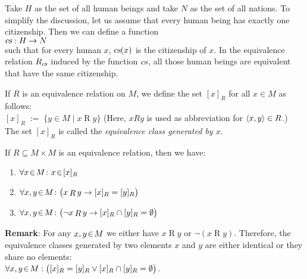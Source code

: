 \example
Take  $H$ as the set of all human beings and take $N$ as the set of all nations.
To simplify the discussion, let us assume that every human being has exactly one citizenship.
Then we can define a function
\\[0.2cm]
\hspace*{1.3cm}
$\textsl{cs}: H \rightarrow N$
\\[0.2cm]
such that for every human $x$,  $\textsl{cs}(x)$ is the citizenship of $x$.  
In the equivalence relation $R_{\textsl{cs}}$ induced by the function $\textsl{cs}$, all those human
beings are equivalent that have the same citizenship.


\begin{Definition}
If $R$ is an  equivalence relation on  $M$, we define 
the set $[x]_R$ for all  $x \in M$ as follows: 
\\[0.2cm]
\hspace*{1.3cm}
$[x]_R \;:=\; \bigl\{ y \in M \mid x \mathop{R} y \bigr\}$ \qquad
(Here,  $x R y$ is used as abbreviation for $\pair(x, y) \in R$.) 
\\[0.2cm]
The set  $[x]_R$ is called the \emph{equivalence class generated by $x$}.
\end{Definition}

\begin{Proposition} \label{prop:14}
If $R \subseteq M \times M$ is an equivalence relation, then we have: 
\begin{enumerate}
\item $\forall x \!\in\! M \colon x \!\in\! [x]_R$
\item $\forall x, y \!\in\! M \colon \bigl(x \mathop{R} y \rightarrow [x]_R = [y]_R\bigr)$
\item $\forall x, y \!\in\! M \colon \bigl(\neg x \mathop{R} y \rightarrow [x]_R \cap [y]_R = \emptyset\bigr)$
\end{enumerate}
\end{Proposition}

\noindent
\textbf{Remark}: For any $x,y\!\in\! M$ we either have $x \mathop{R} y$ or
 $\neg (x \mathop{R} y)$.  
Therefore, the equivalence classes generated by two elements $x$ and $y$ are either
identical or they share no elements:
\\[0.2cm]
\hspace*{1.3cm}
$\forall x, y \!\in\! M: \bigl([x]_R = [y]_R \vee [x]_R \cap [y]_R = \emptyset\bigr)$.
\pagebreak


